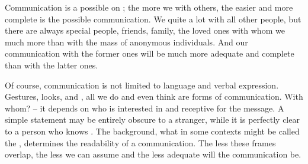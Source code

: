 \pa
Communication is a possible  
 on ; the more we  with others, the
easier and more complete is the possible communication. 
We  
quite a lot with all other people, but there are always special 
people, friends, family, the loved ones with whom we  much 
more than with the mass of anonymous individuals. And our 
communication with the former ones will be much more adequate and 
complete than with the latter ones. 

Of course, communication is not limited to language and verbal 
expression. Gestures, looks,  and , all we do and 
even think are forms of communication. With whom? -- it depends on who 
is interested in and receptive for the message. A simple statement may be 
entirely obscure to a stranger, while it is perfectly clear to a 
person who knows . The  background, what in some 
contexts might be called the , determines 
the readability of a communication. The less these frames 
overlap, the less  we can assume and the less adequate 
will the communication be. 

